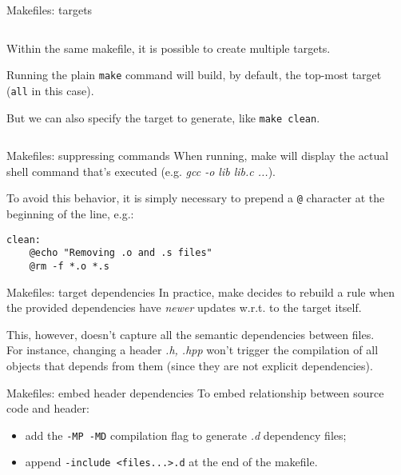 \begin{frame}[fragile]{Makefiles: targets}
    \begin{columns}[c]
      \begin{column}{0.42\textwidth}
          Within the same makefile, it is possible to create multiple targets.  \vspace{3mm}

          Running the plain \texttt{make} command will build, by default, the top-most target (\texttt{all} in this case). \vspace{3mm}

          But we can also specify the target to generate, like \texttt{make clean}.
      \end{column}
      \begin{column}{0.54\textwidth}
          
      \end{column}
    \end{columns}
\end{frame}

\begin{frame}[fragile]{Makefiles: suppressing commands}
    When running, make will display the actual shell command that's executed (e.g. \textit{gcc -o lib lib.c ...}).

    To avoid this behavior, it is simply necessary to prepend a \texttt{@} character at the beginning of the line, e.g.:
    \begin{lstlisting}
clean:
    @echo "Removing .o and .s files"
    @rm -f *.o *.s\end{lstlisting}
\end{frame}

\begin{frame}[fragile]{Makefiles: target dependencies}
    In practice, make decides to rebuild a rule when the provided dependencies have \textit{newer} updates w.r.t. to the target itself.

    This, however, doesn't capture all the semantic dependencies between files. \\
    For instance, changing a header \textit{.h, .hpp} won't trigger the compilation of all objects that depends from them (since they are not explicit dependencies).
\end{frame}

\begin{frame}[fragile]{Makefiles: embed header dependencies}
    To embed relationship between source code and header:
    \begin{itemize}
        \item add the \texttt{-MP -MD} compilation flag to generate \textit{.d} dependency files;
        \item append \texttt{-include <files...>.d} at the end of the makefile.
    \end{itemize}
\end{frame}

